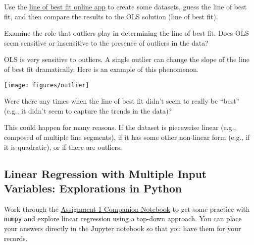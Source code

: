 \documentclass[assignment01_Solutions]{subfiles}
\begin{document}
\begin{externalresources}
Use the \href{http://www.shodor.org/interactivate/activities/Regression/}{line of best fit online app} to create some datasets, guess the line of best fit, and then compare the results to the OLS solution (line of best fit).

\begin{exercise}
\bes
\item Examine the role that outliers play in determining the line of best fit.  Does OLS seem sensitive or insensitive to the presence of outliers in the data?
\begin{boxedsolution}
OLS is very sensitive to outliers.  A single outlier can change the slope of the line of best fit dramatically.  Here is an example of this phenomenon.

\begin{center}
\texttt{[image: figures/outlier]}
\end{center}

\end{boxedsolution}

\item Were there any times when the line of best fit didn't seem to really be ``best'' (e.g., it didn't seem to capture the trends in the data)?
\begin{boxedsolution}
This could happen for many reasons.  If the dataset is pieceweise linear (e.g., composed of multiple line segments), if it has some other non-linear form (e.g., if it is quadratic), or if there are outliers.
\end{boxedsolution}

\ees
\end{exercise}

\end{externalresources}



\subsection{Linear Regression with Multiple Input Variables: Explorations in Python}
\begin{externalresources}[(90 minutes)]
Work through the \href{https://colab.research.google.com/drive/12pLbQkhrPoI-22FVV6gZNObi1IJCW-mF}{Assignment 1 Companion Notebook} to get some practice with {\tt numpy} and explore linear regression using a top-down approach.  You can place your answers directly in the Jupyter notebook so that you have them for your records.
\end{externalresources}

\end{document}
